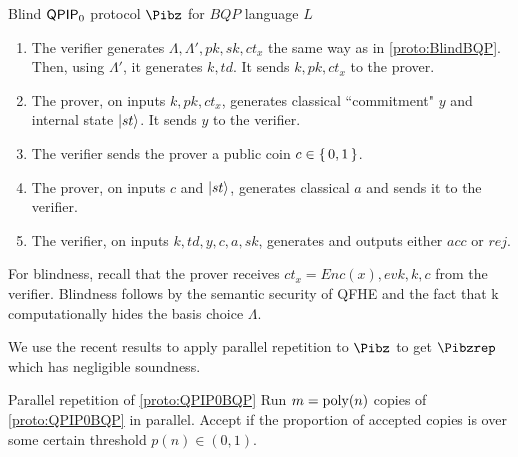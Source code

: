 \begin{protocol}{Blind $\operatorname{\mathsf{QPIP}}_0$ protocol $\Pibz$ for $BQP$ language $L$}
	\label{proto:QPIP0BQP}
	\begin{enumerate}
		\item The verifier generates $\Lambda, \Lambda', pk, sk, ct_x$ the same way as in \cref{proto:BlindBQP}. 
			Then, using $\Lambda'$, it generates $k, td$.
			It sends $k, pk, ct_x$ to the prover.
		\item The prover, on inputs $k, pk, ct_x$, generates classical ``commitment" $y$ and internal state $\ket{st}$.
			It sends $y$ to the verifier.
		\item The verifier sends the prover a public coin $c\in\set{0,1}$.
		\item The prover, on inputs $c$ and $\ket{st}$, generates classical $a$ and sends it to the verifier.
		\item The verifier, on inputs $k, td, y, c, a, sk$, generates and outputs either $acc$ or $rej$.
	\end{enumerate}
\end{protocol}



For blindness, recall that the prover receives $ct_x = Enc(x), evk, k, c$ from the verifier. Blindness follows by the semantic security of QFHE and the fact that k computationally hides the basis choice $\Lambda$.

We use the recent results \cite{parallelrep, alagic2019twomessage} to apply parallel repetition to $\Pibz$ to get $\Pibzrep$ which has negligible soundness.


\begin{protocol}{Parallel repetition of \cref{proto:QPIP0BQP}}
	\label{proto:repQPIP0BQP}
	Run $m=\operatorname*{\operatorname{poly}}(n)$ copies of \cref{proto:QPIP0BQP} in parallel. Accept if the proportion of accepted copies is over some certain threshold $p(n)\in(0, 1)$.

\end{protocol}

